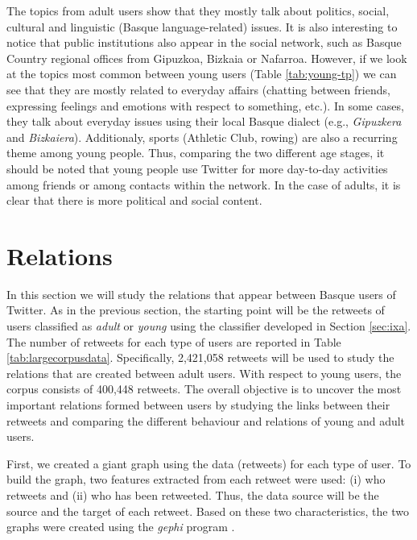 \documentclass[information,article,submit,moreauthors,pdftex,10pt,a4paper]{Definitions/mdpi}
\begin{document}
The topics from adult users show that they mostly talk about politics, social, cultural and linguistic (Basque language-related) issues. It is also interesting to notice that public institutions also appear in the social network, such as Basque Country regional offices from Gipuzkoa, Bizkaia or Nafarroa. However, if we look at the topics most common between young users (Table \ref{tab:young-tp}) we can see that they are mostly related to everyday affairs (chatting between friends, expressing feelings and emotions with respect to something, etc.). In some cases, they talk about everyday issues using their local Basque dialect (e.g., \emph{Gipuzkera} and \emph{Bizkaiera}). Additionaly, sports (Athletic Club, rowing) are also a recurring theme among young people. Thus, comparing the two different age stages, it should be noted that young people use Twitter for more day-to-day activities among friends or among contacts within the network. In the case of adults, it is clear that there is more political and social content.



\section{Relations}\label{sec:connections}

In this section we will study the relations that appear between Basque users of Twitter. As in the previous section, the starting point will be the retweets of users classified as \emph{adult} or \emph{young} using the classifier developed in Section \ref{sec:ixa}. The number of retweets for each type of users are reported in Table \ref{tab:largecorpusdata}. Specifically, 2,421,058 retweets will be used to study the relations that are created between adult users. With respect to young users, the corpus consists of 400,448 retweets. The overall objective is to uncover the most important relations formed between users by studying the links between their retweets and comparing the different behaviour and relations of young and adult users.

First, we created a giant graph using the data (retweets) for each type of user. To build the graph, two features extracted from each retweet were used: (i) who retweets and (ii) who has been retweeted. Thus, the data source will be the source and the target of each retweet. Based on these two characteristics, the two graphs were created using the \textit{gephi} program \cite{bastian2009gephi}.
\end{document}

